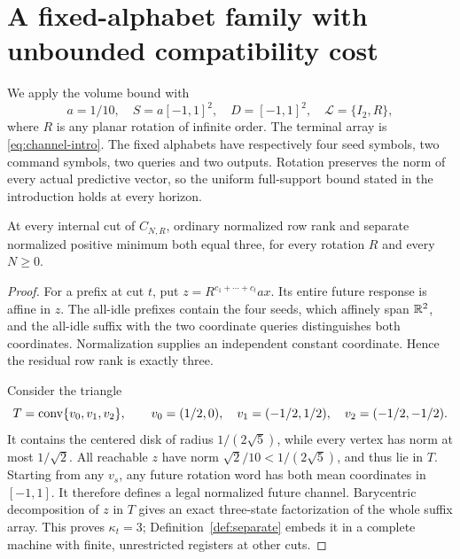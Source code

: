 \section{A fixed-alphabet family with unbounded compatibility cost}
\label{sec:rotation}
We apply the volume bound with
\[
 a=1/10,\quad S=a[-1,1]^2,\quad D=[-1,1]^2,
 \quad\mathcal L=\{I_2,R\},
\]
where $R$ is any planar rotation of infinite order. The terminal array is
\eqref{eq:channel-intro}. The fixed alphabets have respectively four seed
symbols, two command symbols, two queries and two outputs. Rotation
preserves the norm of every actual predictive vector, so the uniform
full-support bound stated in the introduction holds at every horizon.

\begin{proposition}
\label{prop:static-three}
At every internal cut of $C_{N,R}$, ordinary normalized row rank and
separate normalized positive minimum both equal three, for every
rotation $R$ and every $N\ge0$.
\end{proposition}
\begin{proof}
For a prefix at cut $t$, put $z=R^{c_1+\cdots+c_t}a x$.
Its entire future response is affine in $z$. The all-idle prefixes
contain the four seeds, which affinely span $\mathbb R^2$, and the all-idle
suffix with the two coordinate queries distinguishes both coordinates.
Normalization supplies an independent constant coordinate. Hence the
residual row rank is exactly three.

Consider the triangle
\begin{equation}\label{eq:static-triangle}
 T=\operatorname{conv}\{v_0,v_1,v_2\},\qquad
 v_0=(1/2,0),\quad v_1=(-1/2,1/2),\quad v_2=(-1/2,-1/2).
\end{equation}
It contains the centered disk of radius $1/(2\sqrt5)$, while every
vertex has norm at most $1/\sqrt2$. All reachable $z$ have norm
$\sqrt2/10<1/(2\sqrt5)$, and thus lie in $T$.
Starting from any $v_s$, any future rotation word has both mean
coordinates in $[-1,1]$. It therefore defines a legal normalized future
channel. Barycentric decomposition of $z$ in $T$ gives an exact
three-state factorization of the whole suffix array. This proves
$\kappa_t=3$; Definition~\ref{def:separate} embeds it in a complete
machine with finite, unrestricted registers at other cuts.
\end{proof}

